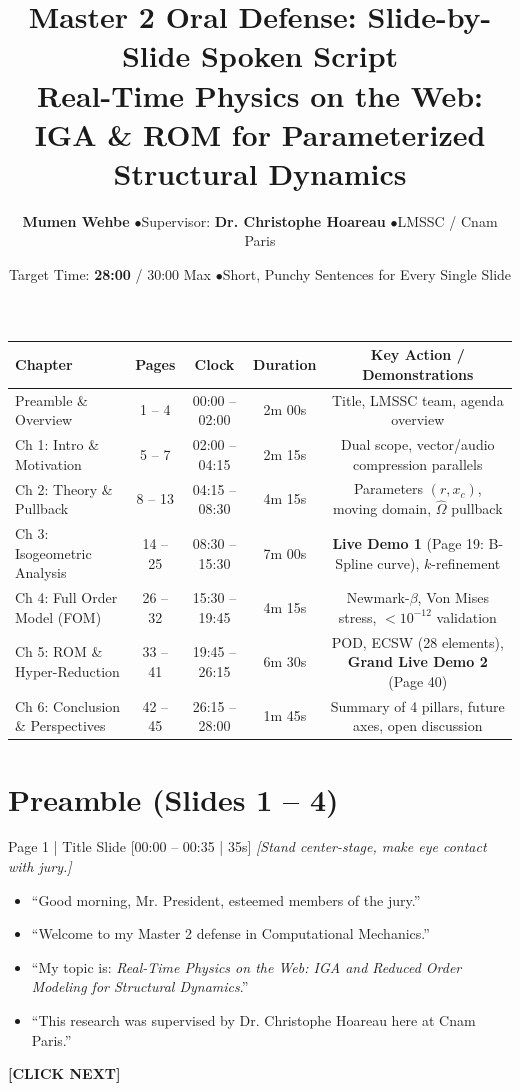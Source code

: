 \documentclass[9pt,a4paper]{article}
\title{\textbf{\color{cnamred} Master 2 Oral Defense: Slide-by-Slide Spoken Script}\\[0.1cm]\small\color{graytext} Real-Time Physics on the Web: IGA \& ROM for Parameterized Structural Dynamics}
\author{\textbf{Mumen Wehbe} \quad$\bullet$\quad Supervisor: \textbf{Dr. Christophe Hoareau} \quad$\bullet$\quad LMSSC / Cnam Paris}
\date{Target Time: \textbf{28:00} / 30:00 Max \quad$\bullet$\quad Short, Punchy Sentences for Every Single Slide}
\begin{document}
\maketitle

\vspace{-0.5cm}
\begin{center}
\scriptsize
\begin{tabular}{lcccc}
\toprule
\textbf{Chapter} & \textbf{Pages} & \textbf{Clock} & \textbf{Duration} & \textbf{Key Action / Demonstrations} \\
\midrule
Preamble \& Overview & 1 -- 4 & 00:00 -- 02:00 & 2m 00s & Title, LMSSC team, agenda overview \\
Ch 1: Intro \& Motivation & 5 -- 7 & 02:00 -- 04:15 & 2m 15s & Dual scope, vector/audio compression parallels \\
Ch 2: Theory \& Pullback & 8 -- 13 & 04:15 -- 08:30 & 4m 15s & Parameters $(r, x_c)$, moving domain, $\hat{\Omega}$ pullback \\
Ch 3: Isogeometric Analysis & 14 -- 25 & 08:30 -- 15:30 & 7m 00s & \textbf{Live Demo 1} (Page 19: B-Spline curve), $k$-refinement \\
Ch 4: Full Order Model (FOM) & 26 -- 32 & 15:30 -- 19:45 & 4m 15s & Newmark-$\beta$, Von Mises stress, $<10^{-12}$ validation \\
Ch 5: ROM \& Hyper-Reduction & 33 -- 41 & 19:45 -- 26:15 & 6m 30s & POD, ECSW (28 elements), \textbf{Grand Live Demo 2} (Page 40) \\
Ch 6: Conclusion \& Perspectives & 42 -- 45 & 26:15 -- 28:00 & 1m 45s & Summary of 4 pillars, future axes, open discussion \\
\bottomrule
\end{tabular}
\end{center}

\vspace{-0.1cm}

\section*{Preamble (Slides 1 -- 4)}

\begin{slidebox}{Page 1 | Title Slide \hfill [00:00 -- 00:35 | 35s]}
\textit{[Stand center-stage, make eye contact with jury.]}
\begin{itemize}
  \item ``Good morning, Mr. President, esteemed members of the jury.''
  \item ``Welcome to my Master 2 defense in Computational Mechanics.''
  \item ``My topic is: \textit{Real-Time Physics on the Web: IGA and Reduced Order Modeling for Structural Dynamics}.''
  \item ``This research was supervised by Dr. Christophe Hoareau here at Cnam Paris.''
\end{itemize}
\textbf{\color{cnamred}[CLICK NEXT]}
\end{slidebox}
\end{document}

